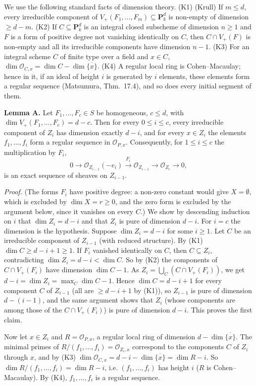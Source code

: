 \documentclass[11pt]{article}
\begin{document}
We use the following standard facts of dimension theory. (K1) (Krull) If $m\le d$, every irreducible component of $V_+(F_1,\dots,F_m)\subseteq\mathbf P^d_k$ is non-empty of dimension $\ge d-m$. (K2) If $C\subseteq\mathbf P^d_k$ is an integral closed subscheme of dimension $n\ge1$ and $F$ is a form of positive degree not vanishing identically on $C$, then $C\cap V_+(F)$ is non-empty and all its irreducible components have dimension $n-1$. (K3) For an integral scheme $C$ of finite type over a field and $x\in C$, $\dim\mathcal O_{C,x}=\dim C-\dim\overline{\{x\}}$. (K4) A regular local ring is Cohen--Macaulay; hence in it, if an ideal of height $i$ is generated by $i$ elements, these elements form a regular sequence (Matsumura, Thm.~17.4), and so does every initial segment of them.

\textbf{Lemma A.} Let $F_1,\dots,F_c\in S$ be homogeneous, $c\le d$, with $\dim V_+(F_1,\dots,F_c)=d-c$. Then for every $0\le i\le c$, every irreducible component of $Z_i$ has dimension exactly $d-i$, and for every $x\in Z_i$ the elements $f_1,\dots,f_i$ form a regular sequence in $\mathcal O_{P,x}$. Consequently, for $1\le i\le c$ the multiplication by $F_i$,
\[ 0\to\mathcal O_{Z_{i-1}}(-e_i)\xrightarrow{\,F_i\,}\mathcal O_{Z_{i-1}}\to\mathcal O_{Z_i}\to0, \]
is an exact sequence of sheaves on $Z_{i-1}$.

\emph{Proof.} (The forms $F_i$ have positive degree: a non-zero constant would give $X=\emptyset$, which is excluded by $\dim X=r\ge0$, and the zero form is excluded by the argument below, since it vanishes on every $C$.) We show by descending induction on $i$ that $\dim Z_i=d-i$ and that $Z_i$ is pure of dimension $d-i$. For $i=c$ the dimension is the hypothesis. Suppose $\dim Z_i=d-i$ for some $i\ge1$. Let $C$ be an irreducible component of $Z_{i-1}$ (with reduced structure). By (K1) $\dim C\ge d-i+1\ge1$. If $F_i$ vanished identically on $C$, then $C\subseteq Z_i$, contradicting $\dim Z_i=d-i<\dim C$. So by (K2) the components of $C\cap V_+(F_i)$ have dimension $\dim C-1$. As $Z_i=\bigcup_C(C\cap V_+(F_i))$, we get $d-i=\dim Z_i=\max_C\dim C-1$. Hence $\dim C=d-i+1$ for every component $C$ of $Z_{i-1}$ (all are $\ge d-i+1$ by (K1)), so $Z_{i-1}$ is pure of dimension $d-(i-1)$, and the same argument shows that $Z_i$ (whose components are among those of the $C\cap V_+(F_i)$) is pure of dimension $d-i$. This proves the first claim.

Now let $x\in Z_i$ and $R=\mathcal O_{P,x}$, a regular local ring of dimension $d-\dim\overline{\{x\}}$. The minimal primes of $R/(f_1,\dots,f_i)=\mathcal O_{Z_i,x}$ correspond to the components $C$ of $Z_i$ through $x$, and by (K3) $\dim\mathcal O_{C,x}=d-i-\dim\overline{\{x\}}=\dim R-i$. So $\dim R/(f_1,\dots,f_i)=\dim R-i$, i.e. $(f_1,\dots,f_i)$ has height $i$ ($R$ is Cohen--Macaulay). By (K4), $f_1,\dots,f_i$ is a regular sequence.
\end{document}
